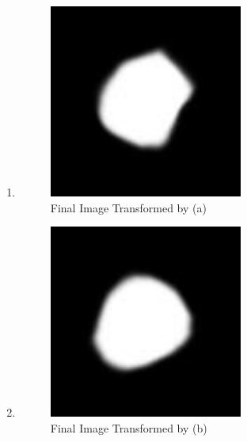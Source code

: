 \documentclass[11pt]{article}
\begin{document}
\begin{enumerate}
\begin{enumerate}
\item
\begin{figure}[h]
	\begin{center}
		\includegraphics[width=0.6\textwidth]{./code/result_a}
		\caption{Final Image Transformed by (a)}
		\label{fig:f_res_a}
	\end{center}
\end{figure}


\item
\begin{figure}[h]
	\begin{center}
		\includegraphics[width=0.6\textwidth]{./code/result_b}
		\caption{Final Image Transformed by (b)}
		\label{fig:f_res_b}
	\end{center}
\end{figure}


\end{enumerate}


\end{enumerate}
\end{document}
